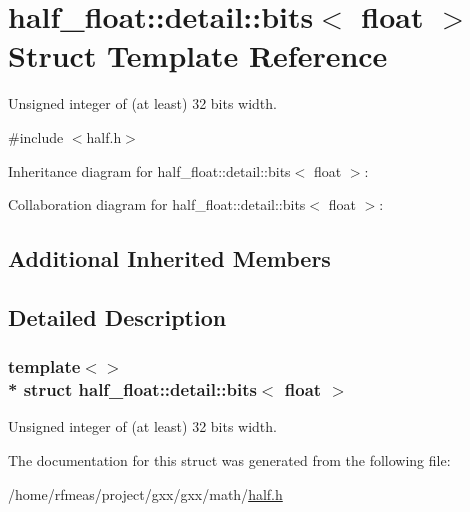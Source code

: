 \hypertarget{structhalf__float_1_1detail_1_1bits_3_01float_01_4}{}\section{half\+\_\+float\+:\+:detail\+:\+:bits$<$ float $>$ Struct Template Reference}
\label{structhalf__float_1_1detail_1_1bits_3_01float_01_4}


Unsigned integer of (at least) 32 bits width.  




{\ttfamily \#include $<$half.\+h$>$}



Inheritance diagram for half\+\_\+float\+:\+:detail\+:\+:bits$<$ float $>$\+:


Collaboration diagram for half\+\_\+float\+:\+:detail\+:\+:bits$<$ float $>$\+:
\subsection*{Additional Inherited Members}


\subsection{Detailed Description}
\subsubsection*{template$<$$>$\\*
struct half\+\_\+float\+::detail\+::bits$<$ float $>$}

Unsigned integer of (at least) 32 bits width. 

The documentation for this struct was generated from the following file\+:\begin{DoxyCompactItemize}
\item 
/home/rfmeas/project/gxx/gxx/math/\hyperlink{half_8h}{half.\+h}\end{DoxyCompactItemize}
